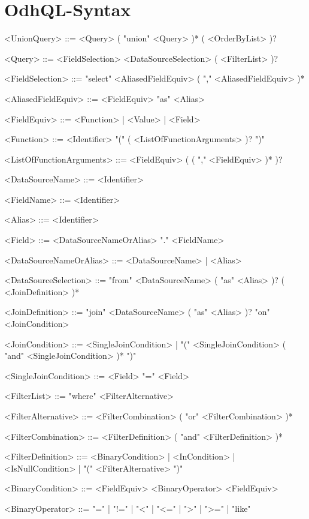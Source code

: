 \chapter{OdhQL-Syntax}\label{app:odhql-syntax}
\begin{grammar}
\small
<UnionQuery> ::= <Query> ( "union" <Query> )* ( <OrderByList> )?

<Query> ::= <FieldSelection> <DataSourceSelection> ( <FilterList> )?

<FieldSelection> ::= "select" <AliasedFieldEquiv> ( "," <AliasedFieldEquiv> )*

<AliasedFieldEquiv> ::= <FieldEquiv> "as" <Alias>

<FieldEquiv> ::= <Function> | <Value> | <Field>

<Function> ::= <Identifier> "(" ( <ListOfFunctionArguments> )? ")"

<ListOfFunctionArguments> ::= <FieldEquiv> ( ( "," <FieldEquiv> )* )?

<DataSourceName> ::= <Identifier>

<FieldName> ::= <Identifier>

<Alias> ::= <Identifier>

<Field> ::= <DataSourceNameOrAlias> "." <FieldName>

<DataSourceNameOrAlias> ::= <DataSourceName> | <Alias>

<DataSourceSelection> ::= "from" <DataSourceName> ( "as" <Alias> )? ( <JoinDefinition> )*

<JoinDefinition> ::= "join" <DataSourceName> ( "as" <Alias> )? "on" <JoinCondition>

<JoinCondition> ::= <SingleJoinCondition> | "(" <SingleJoinCondition> ( "and" <SingleJoinCondition> )* ")"

<SingleJoinCondition> ::= <Field> "=" <Field>

<FilterList> ::= "where" <FilterAlternative>

<FilterAlternative> ::= <FilterCombination> ( "or" <FilterCombination> )*

<FilterCombination> ::= <FilterDefinition> ( "and" <FilterDefinition> )*

<FilterDefinition> ::= <BinaryCondition> | <InCondition> |
                   <IsNullCondition> | "(" <FilterAlternative> ")"

<BinaryCondition> ::= <FieldEquiv> <BinaryOperator> <FieldEquiv>

<BinaryOperator> ::= "=" | "!=" | "<" | "<=" | ">" | ">=" | "like"


\end{grammar}
